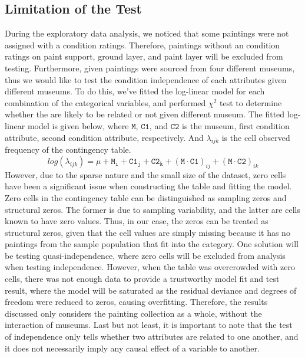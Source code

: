 \documentclass[11pt, oneside]{article}
\begin{document}
\subsection{Limitation of the Test}
During the exploratory data analysis, we noticed that some paintings were not assigned with a condition ratings. Therefore, paintings without an condition ratings on paint support, ground layer, and paint layer will be excluded from testing.
\bigbreak
\noindent Furthermore, given paintings were sourced from four different museums, thus we would like to test the condition independence of each attributes given different museums. To do this, we've fitted the log-linear model for each combination of the categorical variables, and performed $\chi^2$ test to determine whether the are likely to be related or not given different museum. The fitted log-linear model is given below, where $\mathtt{M}$, $\mathtt{C1}$, and $\mathtt{C2}$ is the museum, first condition attribute, second condition attribute, respectively. And $\lambda_{ijk}$ is the cell observed frequency of the contingency table.
\[log(\lambda_{ijk}) = \mu + \mathtt{M_i} + \mathtt{C1_j} + \mathtt{C2_k} + (\mathtt{M}\cdot\mathtt{C1})_{ij} + (\mathtt{M}\cdot\mathtt{C2})_{ik}\]
However, due to the sparse nature and the small size of the dataset, zero cells have been a significant issue when constructing the table and fitting the model. Zero cells in the contingency table can be distinguished as sampling zeros and structural zeros. The former is due to sampling variability, and the latter are cells known to have zero values. Thus, in our case, the zeros can be treated as structural zeros, given that the cell values are simply missing because it has no paintings from the sample population that fit into the category. 
\bigbreak
\noindent One solution will be testing quasi-independence, where zero cells will be excluded from analysis when testing independence. However, when the table was overcrowded with zero cells, there was not enough data to provide a trustworthy model fit and test result, where the model will be saturated as the residual deviance and degrees of freedom were reduced to zeros, causing overfitting. Therefore, the results discussed only considers the painting collection as a whole, without the interaction of museums. Last but not least, it is important to note that the test of independence only tells whether two attributes are related to one another, and it does not necessarily imply any causal effect of a variable to another.
\end{document}
